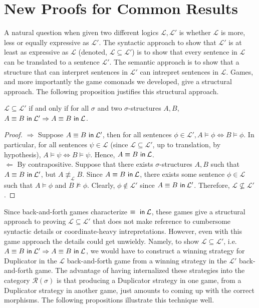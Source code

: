 \section{New Proofs for Common Results}\label{sec:commonResults}
A natural question when given two different logics $\mathcal{L},\mathcal{L'}$ is whether $\mathcal{L}$ is more, less or equally expressive as $\mathcal{L'}$. The syntactic approach to show that $\mathcal{L'}$ is at least as expressive as $\mathcal{L}$ (denoted, $\mathcal{L} \subseteq \mathcal{L'}$) is to show that every sentence in $\mathcal{L}$ can be translated to a sentence $\mathcal{L'}$. The semantic approach is to show that a structure that can interpret sentences in $\mathcal{L'}$ can intrepret sentences in $\mathcal{L}$. Games, and more importantly the game comonads we developed, give a structural approach. The following proposition justifies this structural approach. 
\begin{prop}
$\mathcal{L} \subseteq \mathcal{L'}$ if and only if for all $\sigma$ and two $\sigma$-structures $A,B$, ${A \equiv B \ \mathsf{in}\: \mathcal{L'}} \Rightarrow {A \equiv B \ \mathsf{in}\: \mathcal{L}}$.
\begin{proof}
$\Rightarrow$ Suppose ${A \equiv B \ \mathsf{in}\: \mathcal{L'}}$, then for all sentences $\phi \in \mathcal{L'}, A \vDash \phi \Leftrightarrow B \vDash \phi$. In particular, for all sentences $\psi \in \mathcal{L}$ (since $\mathcal{L} \subseteq \mathcal{L'}$, up to translation, by hypothesis), $A \vDash \psi \Leftrightarrow B \vDash \psi$. Hence, ${A \equiv B \ \mathsf{in}\: \mathcal{L}}$.\\
$\Leftarrow$ By contrapositive. Suppose that there exists $\sigma$-structures $A,B$ such that ${A \equiv B \ \mathsf{in}\: \mathcal{L'}}$, but $A \not\equiv_{\mathcal{L}} B$. Since ${A \equiv B \ \mathsf{in}\: \mathcal{L}}$, there exists some sentence $\phi \in \mathcal{L}$ such that $A \vDash \phi$ and $B \not\vDash \phi$. Clearly, $\phi \not\in \mathcal{L'}$ since ${A \equiv B \ \mathsf{in}\: \mathcal{L'}}$. Therefore, $\mathcal{L} \not\subseteq \mathcal{L'}$.
\end{proof}
\label{prop:inclusionToEquiv}
\end{prop}
Since back-and-forth games characterize ${ \equiv  \ \mathsf{in}\: \mathcal{L}}$, these games give a structural approach to proving $\mathcal{L} \subseteq \mathcal{L'}$ that does not make reference to cumbersome syntactic details or coordinate-heavy intrepretations. However, even with this game approach the details could get unwieldy. Namely, to show $\mathcal{L} \subseteq \mathcal{L'}$, i.e. ${A \equiv B \ \mathsf{in}\: \mathcal{L'}} \Rightarrow {A \equiv B \ \mathsf{in}\: \mathcal{L}}$, we would have to construct a winning strategy for Duplicator in the $\mathcal{L}$ back-and-forth game from a winning strategy in the $\mathcal{L'}$ back-and-forth game. The advantage of having internalized these strategies into the category $\mathcal{R}(\sigma)$ is that producing a Duplicator strategy in one game, from a Duplicator strategy in another game, just amounts to coming up with the correct morphisms. The following propositions illustrate this technique well. \\~\\
